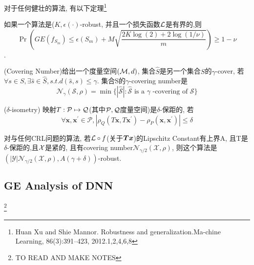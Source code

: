 \documentclass{article}
\begin{document}
对于任何健壮的算法, 有以下定理\footnote{Huan Xu and Shie Mannor.  Robustness and generalization.Ma-chine Learning, 86(3):391–423, 2012.1,2,4,6,8}
\begin{theorem}
如果一个算法是($K,\epsilon(\cdot)$-robust, 并且一个损失函数$\cal L$是有界的,则
\begin{equation}
    \operatorname{Pr}\left(G E\left(f_{S_{m}}\right) \leq \epsilon\left(S_{m}\right)+M \sqrt{\frac{2 K \log (2)+2 \log (1 / \nu)}{m}}\right)\ge 1-\nu
\end{equation}.
\end{theorem}

\begin{definition}
    (Covering Number)给出一个度量空间$(\cal M, d)$, 集合$\hat S$是另一个集合$S$的$\gamma$-cover, 若$\forall s\in S, \exists \hat s\in \hat S, s.t. d(\hat s, s)\le \gamma$. 集合S的$\gamma$-covering number是
    \begin{equation}
        \mathcal{N}_{\gamma}(\mathcal{S}, \rho)=\min \{|\hat{\mathcal{S}}|: \hat{\mathcal{S}} \text { is a } \gamma \text { -covering of } \mathcal{S}\}
    \end{equation}
\end{definition}

\begin{definition}
    ($\delta$-isometry) 映射$T:\cal P\mapsto \cal Q$(其中$\cal P, \cal Q$度量空间)是$\delta$-保距的, 若
    \begin{equation}
        \forall \boldsymbol{x}, \boldsymbol{x}^{\prime} \in \mathcal{P},\left|\rho_{Q}\left(T \boldsymbol{x}, T \boldsymbol{x}^{\prime}\right)-\rho_{P}\left(\boldsymbol{x}, \boldsymbol{x}^{\prime}\right)\right| \leq \delta
    \end{equation}
\end{definition}

\begin{theorem}
    对与任何CRL问题的算法, 若$\cal L\circ f$(关于$\bs T \bs x$)的Lipschitz Constant有上界A, 且T是$\delta$-保距的,且$\cal X$是紧的, 且有covering number$\mathcal{N}_{\gamma / 2}(\mathcal{X}, \rho)$, 则这个算法是$\left(|\mathcal{Y}| \mathcal{N}_{\gamma / 2}(\mathcal{X}, \rho), A(\gamma+\delta)\right)$-robust.
\end{theorem}

\subsection{GE Analysis of DNN}

\footnote{
    TO READ AND MAKE NOTES
}
\end{document}
